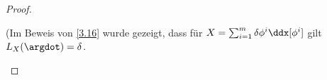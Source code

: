 \begin{st}
\begin{proof}
\begin{note}
            (Im Beweis von \ref{3.16} wurde gezeigt, dass für
            \begin{math}
                X = \sum_{i=1}^m \delta \phi^i \ddx[\phi^i]
            \end{math}
            gilt $L_X(\argdot) = \delta$.
        \end{note}
    \end{proof}
\end{st}

